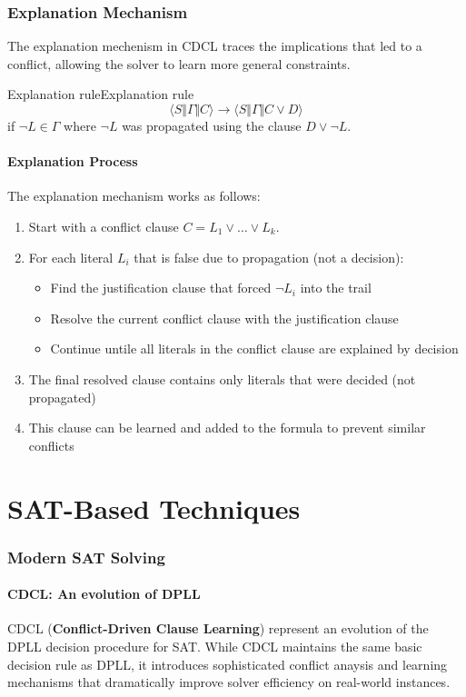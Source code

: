 \documentclass[a4paper]{article}
\theoremstyle{definition}
\begin{document}
\section{Explanation Mechanism}
The explanation mechenism in CDCL traces the implications that led to a conflict,
allowing the solver to learn more general constraints.
\begin{theorem}{Explanation rule}{Explanation rule}
\[ \langle S \Vert \varGamma \Vert C \rangle \rightarrow \langle S \Vert \varGamma \Vert C \vee D \rangle \]
if \( \lnot L \in \varGamma \) where \( \lnot L \) was propagated using the clause \( D \vee \lnot L \).
\end{theorem}
\subsection{Explanation Process}
The explanation mechanism works as follows:
\begin{enumerate}
    \item Start with a conflict clause \( C = L_1 \vee \ldots \vee L_k \).
    \item For each literal \( L_i \) that is false due to propagation (not a decision):
    \begin{itemize}
        \item Find the justification clause that forced \( \lnot L_i \) into the trail 
        \item Resolve the current conflict clause with the justification clause 
        \item Continue untile all literals in the conflict clause are explained by decision 
    \end{itemize}
    \item The final resolved clause contains only literals that were decided (not propagated)
    \item This clause can be learned and added to the formula to prevent similar conflicts
\end{enumerate}
\part{SAT-Based Techniques}
\section{Modern SAT Solving}
\subsection{CDCL: An evolution of DPLL}
CDCL (\textbf{Conflict-Driven Clause Learning}) represent an evolution of the DPLL decision procedure 
for SAT. While CDCL maintains the same basic decision rule as DPLL, it introduces sophisticated conflict anaysis and learning mechanisms that 
dramatically improve solver efficiency on real-world instances.
\end{document}
